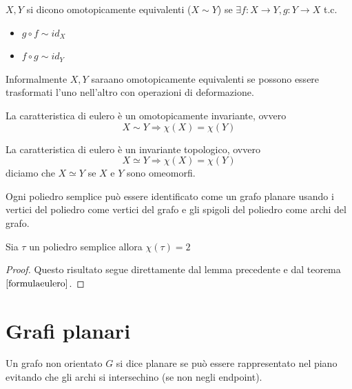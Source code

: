 \begin{definizione}
    \(X,Y\) si dicono omotopicamente equivalenti (\(X\sim Y\)) se \(\exists f : X \to Y, g:Y \to X \) t.c.
    \begin{itemize}
        \item \(g \circ f \sim id_X\)
        \item \(f \circ g \sim id_Y\)
    \end{itemize}
    Informalmente \(X,Y\) saraano omotopicamente equivalenti se possono essere trasformati l'uno nell'altro con operazioni di deformazione.
\end{definizione}

\begin{lemma}\label{om-inv}
    La caratteristica di eulero è un omotopicamente invariante, ovvero
    \begin{equation}
        X \sim Y \Rightarrow \chi (X) = \chi (Y)
    \end{equation}
\end{lemma}

\begin{proposizione}\label{inv-top}
    La caratteristica di eulero è un invariante topologico, ovvero
    \begin{equation}
        X \simeq Y \Rightarrow \chi (X) = \chi (Y)
    \end{equation}
    diciamo che \(X \simeq Y\) se \(X\) e \(Y\) sono omeomorfi.
\end{proposizione}

\begin{lemma}
    Ogni poliedro semplice può essere identificato come un grafo planare usando i vertici del poliedro come vertici del grafo e gli spigoli del poliedro come archi del grafo.
\end{lemma}
\begin{proposizione}
    Sia \(\tau\) un poliedro semplice allora \(\chi(\tau)=2\)
    \begin{proof}
        Questo risultato segue direttamente dal lemma precedente e dal teorema \(\ref{formulaeulero}\).
    \end{proof}
\end{proposizione}

\section{Grafi planari}

\begin{definizione}
    Un grafo non orientato \(G\) si dice planare se può essere rappresentato nel piano evitando che gli archi si intersechino (se non negli endpoint).
\end{definizione}


